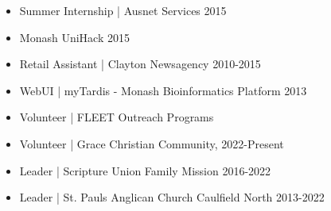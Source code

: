 \documentclass[10pt,a4paper,ragged2e,withhyper]{altacv}
\begin{document}
\begin{paracol}{2}
		


        
        \begin{itemize}
        	\item Summer Internship | Ausnet Services 2015
        	\item Monash UniHack 2015
        	\item Retail Assistant | Clayton Newsagency 2010-2015
        	\item WebUI | myTardis - Monash Bioinformatics Platform 2013
        \end{itemize}
        
        \begin{itemize}
        	\item Volunteer | FLEET Outreach Programs
        	\item Volunteer | Grace Christian Community, 2022-Present\\
        	\item Leader | Scripture Union Family Mission 2016-2022\\
        	\item Leader | St. Pauls Anglican Church Caulfield North 2013-2022
        \end{itemize}
        
        

\end{paracol}
\end{document}
